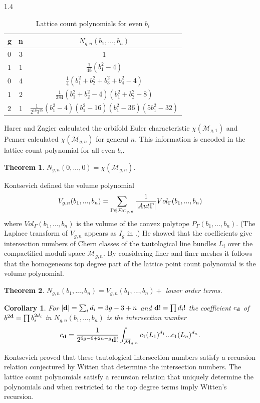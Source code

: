 \documentclass{amsart}
\newtheorem{theorem}{Theorem}
\newtheorem{cor}{Corollary}
\newcommand{\modm}{\mathcal{M}}
\newcommand{\f}{\mathcal{F}}
\newcommand{\fat}{\f\hspace{-.3mm}{\rm at}_{g,n}}
\begin{document}
\begin{table}[b]  \label{tab:poly}
\caption{Lattice count polynomials for even $b_i$}
\begin{spacing}{1.4}  
\begin{tabular}{||l|c|c||} 
\hline\hline

{\bf g} &{\bf n}&$N_{g,n}(b_1,...,b_n)$\\ \hline

0&3&1\\ \hline
1&1&$\frac{1}{48}\left(b_1^2-4\right)$\\ \hline
0&4&$\frac{1}{4}\left(b_1^2+b_2^2+b_3^2+b_4^2-4\right)$\\ \hline
1&2&$\frac{1}{384}\left(b_1^2+b_2^2-4\right)\left(b_1^2+b_2^2-8\right)$\\ \hline
2&1&$\frac{1}{2^{16}3^35}\left(b_1^2-4\right)\left(b_1^2-16\right)\left(b_1^2-36\right)\left(5b_1^2-32\right)$\\
\hline\hline
\end{tabular} 
\end{spacing}
\end{table}

Harer and Zagier \cite{HZaEul} calculated the orbifold Euler characteristic $\chi\left(\modm_{g,1}\right)$ and Penner \cite{PenPer} calculated $\chi\left(\modm_{g,n}\right)$ for general $n$.  This information is encoded in the lattice count polynomial for all even $b_i$.
\begin{theorem}  \label{th:euler}
$N_{g,n}(0,...,0)=\chi\left(\modm_{g,n}\right)$.
\end{theorem}

Kontsevich \cite{KonInt} defined the volume polynomial
\[ V_{g,n}(b_1,...,b_n)=\sum_{\Gamma\in \fat}\frac{1}{|Aut \Gamma|}Vol_{\Gamma}(b_1,...,b_n)\]
where $Vol_{\Gamma}(b_1,...,b_n)$ is the volume of the convex polytope $P_{\Gamma}(b_1,...,b_n)$.  (The Laplace transform of $V_{g,n}$ appears as $I_g$ in \cite{KonInt}.)  He showed that the coefficients give intersection numbers of Chern classes of the tautological line bundles $L_i$ over the compactified moduli space $\overline{\modm}_{g,n}$.  By considering finer and finer meshes it follows that the homogeneous top degree part of the lattice point count polynomial is the volume polynomial. 
\begin{theorem}
$N_{g,n}(b_1,...,b_n)=V_{g,n}(b_1,...,b_n)+$ lower order terms.
\end{theorem}
\begin{cor}  \label{th:int}
For $|{\bf d}|=\sum_id_i=3g-3+n$ and ${\bf d}!=\prod d_i!$ the coefficient $c_{\bf d}$ of $b^{2{\bf d}}=\prod b_i^{2d_i}$ in $N_{g,n}(b_1,...,b_n)$ is the intersection number
\[c_{\bf d}=\frac{1}{2^{6g-6+2n-g}{\bf d}!}\int_{\overline{\modm}_{g,n}}c_1(L_1)^{d_1}...c_1(L_n)^{d_n}.\]
\end{cor}
Kontsevich proved that these tautological intersection numbers satisfy a recursion relation conjectured by Witten \cite{WitTwo} that determine the intersection numbers.  The lattice count polynomials satisfy a recursion relation that uniquely determine the polynomials and when restricted to the top degree terms imply Witten's recursion.
\end{document}
